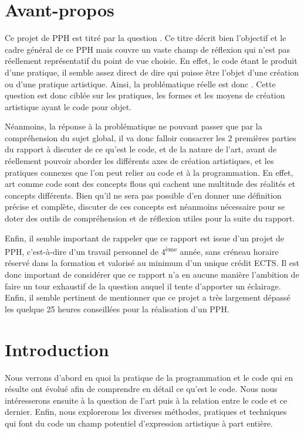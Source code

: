\documentclass[12pt]{article} %
\newcommand{\ts}{\textsuperscript} %
\begin{document}
\section*{Avant-propos}
Ce projet de PPH est titré par la question . Ce titre décrit bien l'objectif et le cadre général de ce PPH mais couvre un vaste champ de réflexion qui n'est pas réellement représentatif du point de vue choisie. En effet, le code étant le produit d'une pratique, il semble assez direct de dire qui puisse être l'objet d'une création ou d'une pratique artistique. Ainsi, la problématique réelle est donc . Cette question est donc ciblée sur les pratiques, les formes et les moyens de création artistique ayant le code pour objet.

Néanmoins, la réponse à la problématique ne pouvant passer que par la compréhension du sujet global, il va donc falloir consacrer les 2 premières parties du rapport à discuter de ce qu'est le code, et de la nature de l'art, avant de réellement pouvoir aborder les différents axes de création artistiques, et les pratiques connexes que l'on peut relier au code et à la programmation. En effet, art comme code sont des concepts flous qui cachent une multitude des réalités et concepts différents. Bien qu'il ne sera pas possible d'en donner une définition précise et complète, discuter de ces concepts est néanmoins nécessaire pour se doter des outils de compréhension et de réflexion utiles pour la suite du rapport.

Enfin, il semble important de rappeler que ce rapport est issue d'un projet de PPH, c'est-à-dire d'un travail personnel de 4\ts{ème} année, sans créneau horaire réservé dans la formation et valorisé au minimum d'un unique crédit ECTS. Il est donc important de considérer que ce rapport n'a en aucune manière l'ambition de faire un tour exhaustif de la question auquel il tente d'apporter un éclairage. Enfin, il semble pertinent de mentionner que ce projet a très largement dépassé les quelque 25 heures conseillées pour la réalisation d'un PPH.

\newpage
\renewcommand{\contentsname}{Table des Matières}
\tableofcontents

\def\lstlistingautorefname{Cd.}
\renewcommand{\lstlistingname}{Code}
\renewcommand{\lstlistlistingname}{Codes et programmes}
\lstlistoflistings

\newpage
{} %

\section{Introduction}
Nous verrons d'abord en quoi la pratique de la programmation et le code qui en résulte ont évolué afin de comprendre en détail ce qu'est le code. Nous nous intéresserons ensuite à la question de l'art puis à la relation entre le code et ce dernier. Enfin, nous explorerons les diverses méthodes, pratiques et techniques qui font du code un champ potentiel d'expression artistique à part entière.
\end{document}

